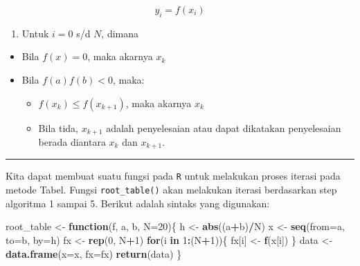 \documentclass[]{book}
\newenvironment{Shaded}{\begin{snugshade}}{\end{snugshade}}
\newcommand{\ControlFlowTok}[1]{\textcolor[rgb]{0.13,0.29,0.53}{\textbf{#1}}}
\newcommand{\DataTypeTok}[1]{\textcolor[rgb]{0.13,0.29,0.53}{#1}}
\newcommand{\DecValTok}[1]{\textcolor[rgb]{0.00,0.00,0.81}{#1}}
\newcommand{\KeywordTok}[1]{\textcolor[rgb]{0.13,0.29,0.53}{\textbf{#1}}}
\newcommand{\NormalTok}[1]{#1}
\newcommand{\OperatorTok}[1]{\textcolor[rgb]{0.81,0.36,0.00}{\textbf{#1}}}
\newcommand{\StringTok}[1]{\textcolor[rgb]{0.31,0.60,0.02}{#1}}
\providecommand{\tightlist}{%
  \setlength{\itemsep}{0pt}\setlength{\parskip}{0pt}}
\theoremstyle{definition}
\theoremstyle{definition}
\theoremstyle{definition}
\theoremstyle{remark}
\begin{document}
\begin{equation}
y_i=f\left(x_i \right)
  \label{eq:tabel3}
\end{equation}

\begin{enumerate}
\def\labelenumi{\arabic{enumi}.}
\setcounter{enumi}{5}
\tightlist
\item
  Untuk \(i=0\) s/d \(N\), dimana
\end{enumerate}

\begin{itemize}
\item
  Bila \(f\left(x \right)=0\), maka akarnya \(x_k\)
\item
  Bila \(f\left(a \right) f\left(b \right) <0\), maka:

  \begin{itemize}
  \tightlist
  \item
    \(f\left(x_k\right)\le f\left(x_{k+1}\right)\), maka akarnya \(x_k\)
  \item
    Bila tida, \(x_{k+1}\) adalah penyelesaian atau dapat dikatakan penyelesaian berada diantara \(x_k\) dan \(x_{k+1}\).
  \end{itemize}
\end{itemize}

\begin{center}\rule{0.5\linewidth}{\linethickness}\end{center}

Kita dapat membuat suatu fungsi pada \texttt{R} untuk melakukan proses iterasi pada metode Tabel. Fungsi \texttt{root\_table()} akan melakukan iterasi berdasarkan step algoritma 1 sampai 5. Berikut adalah sintaks yang digunakan:

\begin{Shaded}
\begin{Highlighting}[]
\NormalTok{root_table <-}\StringTok{ }\ControlFlowTok{function}\NormalTok{(f, a, b, }\DataTypeTok{N=}\DecValTok{20}\NormalTok{)\{}
\NormalTok{    h <-}\StringTok{ }\KeywordTok{abs}\NormalTok{((a}\OperatorTok{+}\NormalTok{b)}\OperatorTok{/}\NormalTok{N)}
\NormalTok{    x <-}\StringTok{ }\KeywordTok{seq}\NormalTok{(}\DataTypeTok{from=}\NormalTok{a, }\DataTypeTok{to=}\NormalTok{b, }\DataTypeTok{by=}\NormalTok{h)}
\NormalTok{    fx <-}\StringTok{ }\KeywordTok{rep}\NormalTok{(}\DecValTok{0}\NormalTok{, N}\OperatorTok{+}\DecValTok{1}\NormalTok{)}
    \ControlFlowTok{for}\NormalTok{(i }\ControlFlowTok{in} \DecValTok{1}\OperatorTok{:}\NormalTok{(N}\OperatorTok{+}\DecValTok{1}\NormalTok{))\{}
\NormalTok{      fx[i] <-}\StringTok{ }\KeywordTok{f}\NormalTok{(x[i])}
\NormalTok{    \}}
\NormalTok{    data <-}\StringTok{ }\KeywordTok{data.frame}\NormalTok{(}\DataTypeTok{x=}\NormalTok{x, }\DataTypeTok{fx=}\NormalTok{fx)}
    \KeywordTok{return}\NormalTok{(data)}
\NormalTok{\}}
\end{Highlighting}
\end{Shaded}
\end{document}
